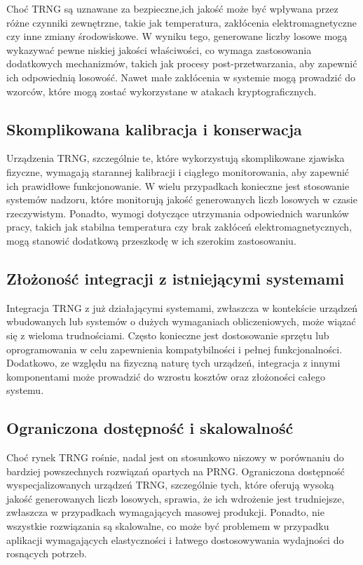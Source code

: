 Choć TRNG są uznawane za bezpieczne,ich jakość może być wpływana przez różne czynniki zewnętrzne, takie jak temperatura,
zakłócenia elektromagnetyczne czy inne zmiany środowiskowe.
W wyniku tego, generowane liczby losowe mogą wykazywać pewne niskiej jakości właściwości,
co wymaga zastosowania dodatkowych mechanizmów, takich jak procesy post-przetwarzania, aby zapewnić ich odpowiednią losowość.
Nawet małe zakłócenia w systemie mogą prowadzić do wzorców, które mogą zostać wykorzystane w atakach kryptograficznych.

\subsection{Skomplikowana kalibracja i konserwacja}

Urządzenia TRNG, szczególnie te, które wykorzystują skomplikowane zjawiska fizyczne, wymagają starannej kalibracji i ciągłego monitorowania,
aby zapewnić ich prawidłowe funkcjonowanie. W wielu przypadkach konieczne jest stosowanie systemów nadzoru,
które monitorują jakość generowanych liczb losowych w czasie rzeczywistym.
Ponadto, wymogi dotyczące utrzymania odpowiednich warunków pracy, takich jak stabilna temperatura czy brak zakłóceń elektromagnetycznych,
mogą stanowić dodatkową przeszkodę w ich szerokim zastosowaniu.

\subsection{Złożoność integracji z istniejącymi systemami}

Integracja TRNG z już działającymi systemami, zwłaszcza w kontekście urządzeń wbudowanych lub systemów o dużych wymaganiach obliczeniowych,
może wiązać się z wieloma trudnościami.
Często konieczne jest dostosowanie sprzętu lub oprogramowania w celu zapewnienia kompatybilności i pełnej funkcjonalności.
Dodatkowo, ze względu na fizyczną naturę tych urządzeń,
integracja z innymi komponentami może prowadzić do wzrostu kosztów oraz złożoności całego systemu.

\subsection{Ograniczona dostępność i skalowalność}

Choć rynek TRNG rośnie, nadal jest on stosunkowo niszowy w porównaniu do bardziej powszechnych rozwiązań opartych na PRNG.
Ograniczona dostępność wyspecjalizowanych urządzeń TRNG, szczególnie tych, które oferują wysoką jakość generowanych liczb losowych,
sprawia, że ich wdrożenie jest trudniejsze, zwłaszcza w przypadkach wymagających masowej produkcji.
Ponadto, nie wszystkie rozwiązania są skalowalne, co może być problemem w przypadku aplikacji
wymagających elastyczności i łatwego dostosowywania wydajności do rosnących potrzeb.

